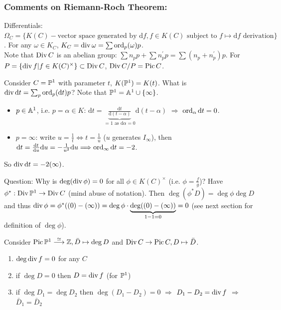 \documentclass[a4paper,11pt]{article}
\begin{document}
			{\color{gray}\subsubsection*{Comments on Riemann-Roch Theorem:}

				\noindent Differentials: $\Omega_C=\{K(C)-\text{vector space generated by }\mathrm{d}f,f\in K(C)\text{ subject to $f\mapsto\mathrm{d}f$ derivation}\}$. For any $\omega\in K_C$, $K_C=\divv\omega=\sum\ord_p(\omega)p$. 
				\\

				\noindent Note that $\Div C$ is an abelian group: $\sum n_pp+\sum n^\prime_pp=\sum(n_p+n^\prime_p)p$. For $P=\{\divv f|f\in K(C)^\times\}\subset\Div C$, $\Div C/P=\pic C$.

				\begin{eg}
					Consider $C=\P^1$ with parameter $t$, $K(\P^1)=K(t)$. What is $\divv \mathrm{d}t=\sum_p\ord_p(\mathrm{d}t)p$? Note that $\P^1=\AA^1\cup\{\infty\}$.
					\begin{itemize}
						\item $p\in\AA^1$, i.e. $p=\alpha\in K$: $\mathrm{d}t=\underbrace{\frac{\mathrm{d}t}{\mathrm{d}(t-\alpha)}}_{=1\text{ as }\mathrm{d}\alpha=0}\mathrm{d}(t-\alpha)$ $\Longrightarrow$ $\ord_\alpha\mathrm{d}t=0$.
						\item $p=\infty$: write $u=\frac{1}{t}\Longleftrightarrow t=\frac{1}{u}$ ($u$ generates $I_\infty$), then $\mathrm{d}t=\frac{\mathrm{d}t}{\mathrm{d}u}\mathrm{d}u=-\frac{1}{u^2}\mathrm{d}u\Longrightarrow\ord_\infty \mathrm{d}t=-2$.
					\end{itemize}
					So $\divv \mathrm{d}t=-2(\infty)$.
				\end{eg}

				Question: Why is $\deg(\divv\phi)=0$ for all $\phi\in K(C)^\times$ (i.e. $\phi=\frac{f}{g}$)? Have $\phi^\ast:\Div\P^1\rightarrow\Div C$ (mind abuse of notation). Then $\deg(\phi^\ast D)=
				\deg\phi \deg D$ and thus $\divv\phi=\phi^\ast((0)-(\infty))=\deg\phi\cdot\underbrace{\deg((0)-(\infty))}_{1-1=0}=0$ (see next section for definition of $\deg \phi$).

				\begin{prop}
					Consider $\pic\P^1\overset{\simeq}{\longrightarrow}\Z, \bar{D}\mapsto\deg D$ and $\Div C\rightarrow\pic C, D\mapsto\bar{D}$.
					\begin{enumerate}
						\item $\deg\divv f=0$ for any $C$
						\item if $\deg D=0$ then $D=\divv f$ (for $\P^1$)
						\item if $\deg D_1=\deg D_2$ then $\deg (D_1-D_2)=0$ $\Longrightarrow$ $D_1-D_2=\divv f$ $\Longrightarrow$ $\bar{D}_1=\bar{D}_2$
					\end{enumerate}
				\end{prop}
			}
\end{document}
